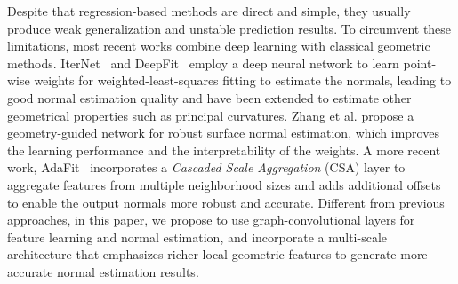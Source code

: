 \documentclass[runningheads]{llncs}
\begin{document}
 Despite that regression-based methods
are direct and simple, they usually produce weak generalization and unstable prediction results. To circumvent these limitations, most recent works combine deep learning with classical geometric methods. IterNet~\cite{lenssen2020deep} and DeepFit~\cite{ben2020deepfit} employ a deep neural network to learn point-wise weights for weighted-least-squares fitting to estimate the normals, leading to good normal estimation quality and have been extended to estimate other geometrical properties such as principal curvatures. Zhang et al. \cite{zhang2022geometry} propose a geometry-guided network for robust surface normal estimation, which improves the learning performance and the interpretability of the weights. A more recent work, AdaFit~\cite{zhu2021adafit} incorporates a \emph{Cascaded Scale Aggregation} (CSA) layer to aggregate features from multiple neighborhood sizes and adds additional offsets to enable the output normals more robust and accurate. Different from previous approaches, in this paper, we propose to use graph-convolutional layers for feature learning and normal estimation, and incorporate a multi-scale architecture that emphasizes richer local geometric features to generate more accurate normal estimation results.
\end{document}
